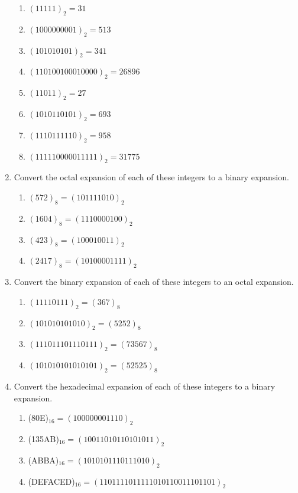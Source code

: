\documentclass[11pt]{article}
\begin{document}
\begin{enumerate}[label=\textbf{\arabic*.}]
	\begin{enumerate}[label=\textbf{\alph*)}]
		\item $(11111)_2 = 31$
		
		\item $(1000000001)_2 = 513$
		
		\item $(101010101)_2 = 341$
		
		\item $(110100100010000)_2 = 26896$
		
		\item $(11011)_2 = 27$
		
		\item $(1010110101)_2 = 693$
		
		\item $(1110111110)_2 = 958$
		
		\item $(111110000011111)_2 = 31775$
	\end{enumerate}

	\item Convert the octal expansion of each of these integers to a binary expansion.
	
	\begin{enumerate}[label=\textbf{\alph*)}]
		\item $(572)_8 = (101111010)_2$
		\item $(1604)_8 = (1110000100)_2$
		\item $(423)_8 = (100010011)_2$
		\item $(2417)_8 = (10100001111)_2$
	\end{enumerate}

	\item Convert the binary expansion of each of these integers to an octal expansion.
	
	\begin{enumerate}[label=\textbf{\alph*)}]
		\item $(11110111)_2 = (367)_8$
		\item $(101010101010)_2  = (5252)_8$
		\item $(111011101110111)_2 = (73567)_8$
		\item $(101010101010101)_2 = (52525)_8$
	\end{enumerate}

	\item Convert the hexadecimal expansion of each of these integers to a binary expansion.
	
	\begin{enumerate}[label=\textbf{\alph*)}]
		\item (80E)$_{16} = (100000001110)_2$
		\item (135AB)$_{16} = (10011010110101011)_2$
		\item (ABBA)$_{16} = (1010101110111010)_2$
		\item (DEFACED)$_{16} = (1101111011111010110011101101)_2$
	\end{enumerate}


\end{enumerate}
\end{document}
